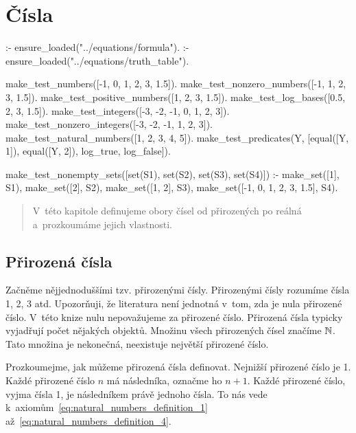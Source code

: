 \chapter{Čísla}

\begin{prolog}
:- ensure_loaded("../equations/formula").
:- ensure_loaded("../equations/truth_table").

make_test_numbers([-1, 0, 1, 2, 3, 1.5]).
make_test_nonzero_numbers([-1, 1, 2, 3, 1.5]).
make_test_positive_numbers([1, 2, 3, 1.5]).
make_test_log_bases([0.5, 2, 3, 1.5]).
make_test_integers([-3, -2, -1, 0, 1, 2, 3]).
make_test_nonzero_integers([-3, -2, -1, 1, 2, 3]).
make_test_natural_numbers([1, 2, 3, 4, 5]).
make_test_predicates(Y, [equal([Y, 1]), equal([Y, 2]), log_true, log_false]).

make_test_nonempty_sets([set(S1), set(S2), set(S3), set(S4)]) :-
	make_set([1], S1),
	make_set([2], S2),
	make_set([1, 2], S3),
	make_set([-1, 0, 1, 2, 3, 1.5], S4).
	
\end{prolog}


\begin{abstract}
V~této kapitole definujeme obory čísel od přirozených po reálná a~prozkoumáme jejich vlastnosti.
\end{abstract}

\section{Přirozená čísla}

Začněme nějjednoduššími tzv. přirozenými čísly. Přirozenými čísly rozumíme čísla 1, 2, 3 atd. Upozorňuji, že literatura není jednotná v~tom, zda je nula přirozené číslo. V~této knize nulu nepovažujeme za přirozené číslo. Přirozená čísla typicky vyjadřují počet nějakých objektů. Množinu všech přirozených čísel značíme \(\mathbb{N}\). Tato množina je nekonečná, neexistuje největší přirozené číslo.

Prozkoumejme, jak můžeme přirozená čísla definovat. Nejnižší přirozené číslo je 1. Každé přirozené číslo \(n\) má
následníka, označme ho \(n + 1\). Každé přirozené číslo, vyjma čísla 1, je následníkem právě jednoho čísla. To nás vede k~axiomům~\eqref{eq:natural_numbers_definition_1} až~\eqref{eq:natural_numbers_definition_4}.

